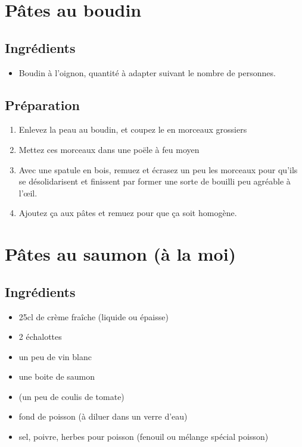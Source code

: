 \newpage
\section{Pâtes au boudin}
\subsection*{Ingrédients}
\begin{itemize}
\item Boudin à l'oignon, quantité à adapter suivant le nombre de personnes.
\end{itemize}

\subsection*{Préparation}
\begin{enumerate}
\item Enlevez la peau au boudin, et coupez le en morceaux grossiers
\item Mettez ces morceaux dans une poële à feu moyen
\item Avec une spatule en bois, remuez et écrasez un peu les morceaux pour qu'ils se désolidarisent et finissent par former une sorte de bouilli peu agréable à l'\oe il.
\item Ajoutez ça aux pâtes et remuez pour que ça soit homogène.
\end{enumerate}

\newpage
\section{Pâtes au saumon (à la moi)}
\subsection*{Ingrédients}
\begin{itemize}
\item 25cl de crème fraîche (liquide ou épaisse)
\item 2 échalottes
\item un peu de vin blanc
\item une boite de saumon
\item (un peu de coulis de tomate)
\item fond de poisson (à diluer dans un verre d'eau)
\item sel, poivre, herbes pour poisson (fenouil ou mélange spécial poisson)
\end{itemize}

